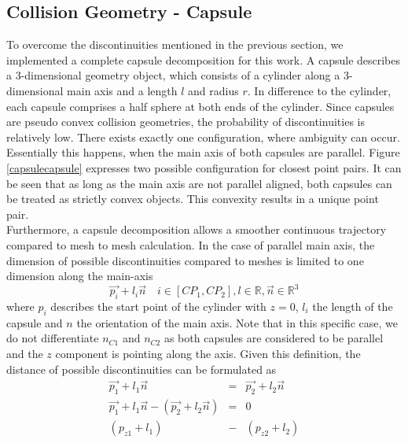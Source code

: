 \subsection{Collision Geometry - Capsule}\label{subsec:capsulecalculation}
To overcome the discontinuities mentioned in the previous section, we implemented a complete capsule decomposition for this work. A capsule describes a 3-dimensional geometry object, which consists of a cylinder along a 3-dimensional main axis and a length $l$ and radius $r$. In difference to the cylinder, each capsule comprises a half sphere at both ends of the cylinder. Since capsules are pseudo convex collision geometries, the probability of discontinuities is relatively low. There exists exactly one configuration, where ambiguity can occur. Essentially this happens, when the main axis of both capsules are parallel. Figure \ref{capsulecapsule} expresses two possible configuration for closest point pairs. It can be seen that as long as the main axis are not parallel aligned, both capsules can be treated as strictly convex objects. This convexity results in a unique point pair. \\
Furthermore, a capsule decomposition allows a smoother continuous trajectory compared to mesh to mesh calculation. In the case of parallel main axis, the dimension of possible discontinuities compared to meshes is limited to one dimension along the main-axis 
\begin{equation}
	\vec{p_i} + l_i  \vec{n} \quad i \in [CP_1,CP_2], l \in \mathbb{R}, \vec{n} \in \mathbb{R}^3
\end{equation}
where $p_i$ describes the start point of the cylinder with $z=0$, $l_i$ the length of the capsule and $n$ the orientation of the main axis. Note that in this specific case, we do not differentiate $n_{C1}$ and $n_{C2}$ as both capsules are considered to be parallel and the $z$ component is pointing along the axis. 
\newpage
Given this definition, the distance of possible discontinuities can be formulated as
\begin{eqnarray}
	\vec{p_1}	 + l_1  \vec{n} &=& \vec{p_2} + l_2  \vec{n} \\
	\vec{p_1} + l_1 \vec{n} - (\vec{p_2} + l_2 \vec{n}) &=& 0 \\
	(p_{z1} + l_1) &-& (p_{z2} + l_2) \label{eqnz}
\end{eqnarray}

